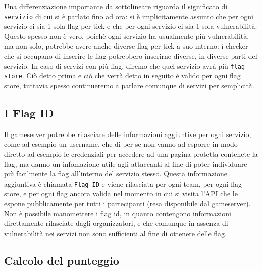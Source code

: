 Una differenziazione importante da sottolineare riguarda il significato di \texttt{servizio} di cui si è parlato fino ad ora:
si è implicitamente assunto che per ogni servizio ci sia 1 sola flag per tick e che per ogni servizio ci sia 1 sola vulnerabilità.
Questo spesso non è vero, poichè ogni servizio ha usualmente più vulnerabilità, ma non solo, potrebbe avere anche diverse flag per tick a suo interno:
i checker che si occupano di inserire le flag potrebbero inserirne diverse, in diverse parti del servizio.
In caso di servizi con più flag, diremo che quel servizio avrà più \texttt{flag store}.
Ciò detto prima e ciò che verrà detto in seguito è valido per ogni flag store, tuttavia spesso continueremo a parlare comunque di servizi per semplicità.

\subsection{I Flag ID}

Il gameserver potrebbe rilasciare delle informazioni aggiuntive per ogni servizio, come ad esempio un username, che di per se non vanno
ad esporre in modo diretto ad esempio le credenziali per accedere ad una pagina protetta contenete la flag, ma danno un infomazione utile agli attaccanti al fine di poter
individuare più facilmente la flag all'interno del servizio stesso.
Questa informazione aggiuntiva è chiamata \texttt{Flag ID} e viene rilasciata per ogni team, per ogni flag store, e per ogni flag ancora valida nel momento in cui si visita l'API che
le espone pubblicamente per tutti i partecipanti (resa disponibile dal gameserver). Non è possibile manomettere i flag id, in quanto contengono informazioni direttamente rilasciate dagli organizzatori, e che comunque in assenza di
vulnerabilità nei servizi non sono sufficienti al fine di ottenere delle flag.

\subsection{Calcolo del punteggio}

